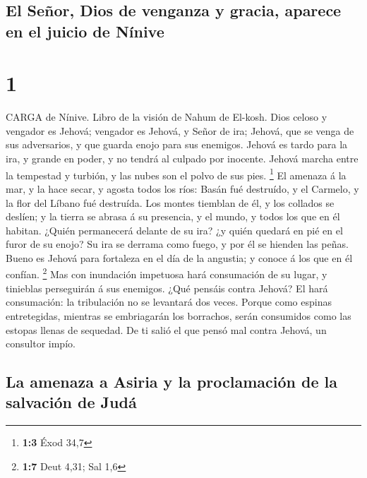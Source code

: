 \hypertarget{el-seuxf1or-dios-de-venganza-y-gracia-aparece-en-el-juicio-de-nuxednive}{%
\subsection{El Señor, Dios de venganza y gracia, aparece en el juicio de
Nínive}\label{el-seuxf1or-dios-de-venganza-y-gracia-aparece-en-el-juicio-de-nuxednive}}

\hypertarget{section}{%
\section{1}\label{section}}

 CARGA de Nínive. Libro de la visión de Nahum de El-kosh.
 Dios celoso y vengador es Jehová; vengador es Jehová, y
Señor de ira; Jehová, que se venga de sus adversarios, y que guarda
enojo para sus enemigos.  Jehová es tardo para la ira, y
grande en poder, y no tendrá al culpado por inocente. Jehová marcha
entre la tempestad y turbión, y las nubes son el polvo de sus pies.
\footnote{\textbf{1:3} Éxod 34,7}  El amenaza á la mar, y la
hace secar, y agosta todos los ríos: Basán fué destruído, y el Carmelo,
y la flor del Líbano fué destruída.  Los montes tiemblan de
él, y los collados se deslíen; y la tierra se abrasa á su presencia, y
el mundo, y todos los que en él habitan.  ¿Quién permanecerá
delante de su ira? ¿y quién quedará en pié en el furor de su enojo? Su
ira se derrama como fuego, y por él se hienden las peñas. 
Bueno es Jehová para fortaleza en el día de la angustia; y conoce á los
que en él confían. \footnote{\textbf{1:7} Deut 4,31; Sal 1,6}
 Mas con inundación impetuosa hará consumación de su lugar,
y tinieblas perseguirán á sus enemigos.  ¿Qué pensáis contra
Jehová? El hará consumación: la tribulación no se levantará dos veces.
 Porque como espinas entretegidas, mientras se embriagarán
los borrachos, serán consumidos como las estopas llenas de sequedad.
 De ti salió el que pensó mal contra Jehová, un consultor
impío.

\hypertarget{la-amenaza-a-asiria-y-la-proclamaciuxf3n-de-la-salvaciuxf3n-de-juduxe1}{%
\subsection{La amenaza a Asiria y la proclamación de la salvación de
Judá}\label{la-amenaza-a-asiria-y-la-proclamaciuxf3n-de-la-salvaciuxf3n-de-juduxe1}}

